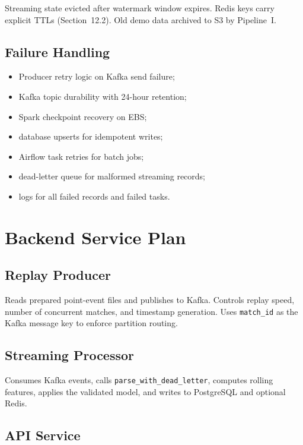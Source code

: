 \documentclass[11pt,a4paper]{article}
\begin{document}
Streaming state evicted after watermark window expires. Redis keys carry explicit TTLs
(Section~12.2). Old demo data archived to S3 by Pipeline~I.

\subsection{Failure Handling}

\begin{itemize}[nosep]
  \item Producer retry logic on Kafka send failure;
  \item Kafka topic durability with 24-hour retention;
  \item Spark checkpoint recovery on EBS;
  \item database upserts for idempotent writes;
  \item Airflow task retries for batch jobs;
  \item dead-letter queue for malformed streaming records;
  \item logs for all failed records and failed tasks.
\end{itemize}

\section{Backend Service Plan}

\subsection{Replay Producer}

Reads prepared point-event files and publishes to Kafka. Controls replay speed, number of
concurrent matches, and timestamp generation. Uses \texttt{match\_id} as the Kafka message key
to enforce partition routing.

\subsection{Streaming Processor}

Consumes Kafka events, calls \texttt{parse\_with\_dead\_letter}, computes rolling features,
applies the validated model, and writes to PostgreSQL and optional Redis.

\subsection{API Service}
\end{document}
